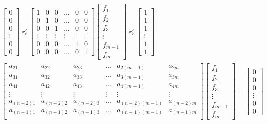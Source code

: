 \documentclass[a4paper]{article}
\begin{document}
\begin{gather*}
	\begin{bmatrix}
		0 \\
		0 \\
		0 \\
		\vdots \\
		0 \\
		0 
	\end{bmatrix}
	\preceq
	\begin{bmatrix}
		1 & 0 & 0 & \dots & 0 & 0 \\
		0 & 1 & 0 & \dots & 0 & 0 \\
		0 & 0 & 1 & \dots & 0 & 0 \\
		\vdots & \vdots & \vdots & \vdots & \vdots & \vdots \\
		0 & 0 & 0 & \dots & 1 & 0 \\
		0 & 0 & 0 & \dots & 0 & 1 
	\end{bmatrix}
	\begin{bmatrix}
		f_{1} \\
		f_{2} \\
		f_{3} \\
		\vdots \\
		f_{m-1} \\
		f_{m} 
	\end{bmatrix}
	\preceq
	\begin{bmatrix}
		1 \\
		1 \\
		1 \\
		\vdots \\
		1 \\
		1 
	\end{bmatrix}
	\\
	\begin{bmatrix}
		a_{21} & a_{22} & a_{23} & \dots & a_{2(m-1)} & a_{2m} \\
		a_{31} & a_{32} & a_{33} & \dots & a_{3(m-1)} & a_{3m} \\
		a_{41} & a_{42} & a_{43} & \dots & a_{4(m-1)} & a_{4m} \\
		\vdots & \vdots & \vdots & \vdots & \vdots & \vdots \\
		a_{(n-2)1} & a_{(n-2)2} & a_{(n-2)3} & \dots & a_{(n-2)(m-1)} & a_{(n-2)m} \\
		a_{(n-1)1} & a_{(n-1)2} & a_{(n-1)3} & \dots & a_{(n-1)(m-1)} & a_{(n-1)m} \\
	\end{bmatrix}
	\begin{bmatrix}
		f_{1} \\
		f_{2} \\
		f_{3} \\
		\vdots \\
		f_{m-1} \\
		f_{m} 
	\end{bmatrix}
	=
	\begin{bmatrix}
		0 \\
		0 \\
		0 \\
		\vdots \\
		0 \\
		0 
	\end{bmatrix}
\end{gather*}
\end{document}
